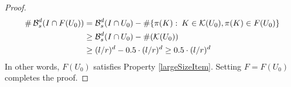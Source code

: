 \begin{proof}
	\begin{align*}
		\# \operatorname{\mathcal{B}}_s^d(I \cap F(U_0)) &= \operatorname{\mathcal{B}}_s^d(I \cap U_0) - \# \{ \pi(K) \operatorname{\colon} K \in \mathcal{K}(U_0), \pi(K) \in F(U_0) \}\\
		&\geq \operatorname{\mathcal{B}}_s^d(I \cap U_0) - \#(\mathcal{K}(U_0))\\
		&\geq (l/r)^d - 0.5 \cdot (l/r)^d \geq 0.5 \cdot (l/r)^d
	\end{align*}  
	In other words, $F(U_0)$ satisfies Property \ref{largeSizeItem}. Setting $F = F(U_0)$ completes the proof.
\end{proof}

